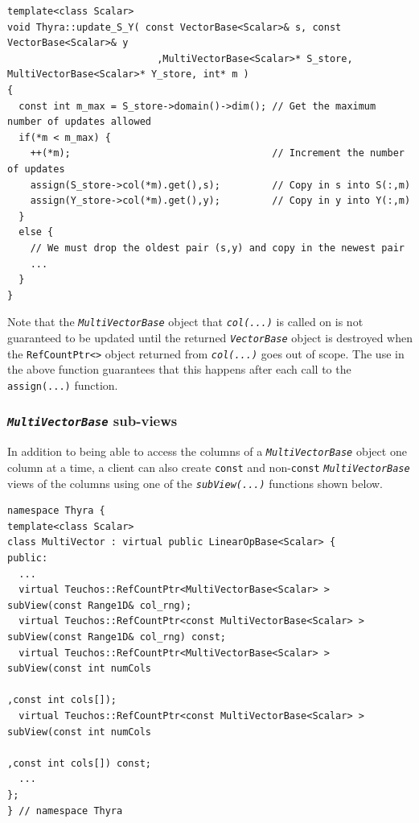 \documentclass[pdf,ps2pdf,11pt]{SANDreport}
\begin{document}
{\scriptsize\begin{verbatim}
template<class Scalar>
void Thyra::update_S_Y( const VectorBase<Scalar>& s, const VectorBase<Scalar>& y
                          ,MultiVectorBase<Scalar>* S_store, MultiVectorBase<Scalar>* Y_store, int* m )
{
  const int m_max = S_store->domain()->dim(); // Get the maximum number of updates allowed
  if(*m < m_max) {
    ++(*m);                                   // Increment the number of updates
    assign(S_store->col(*m).get(),s);         // Copy in s into S(:,m)         
    assign(Y_store->col(*m).get(),y);         // Copy in y into Y(:,m)
  }
  else {
    // We must drop the oldest pair (s,y) and copy in the newest pair
    ...
  }
}
\end{verbatim}}

{}\noindent{}Note that the {}\texttt{\textit{Multi\-Vector\-Base}} object
that {}\texttt{\textit{col(...)}} is called on is not guaranteed to be
updated until the returned {}\texttt{\textit{Vector\-Base}} object is
destroyed when the {}\texttt{RefCountPtr<>} object returned from
{}\texttt{\textit{col(...)}} goes out of scope.  The use in the above
function guarantees that this happens after each call to the
{}\texttt{assign(...)} function.

%
\subsubsection{\texttt{\textit{Multi\-Vector\-Base}} sub-views}
%

In addition to being able to access the columns of a
{}\texttt{\textit{Multi\-Vector\-Base}} object one column at a time, a client
can also create {}\texttt{const} and non-\texttt{const}
{}\texttt{\textit{Multi\-Vector\-Base}} views of the columns
using one of the {}\texttt{\textit{subView(...)}} functions shown below.

{\scriptsize\begin{verbatim}
namespace Thyra {
template<class Scalar>
class MultiVector : virtual public LinearOpBase<Scalar> {
public:
  ...
  virtual Teuchos::RefCountPtr<MultiVectorBase<Scalar> >       subView(const Range1D& col_rng);
  virtual Teuchos::RefCountPtr<const MultiVectorBase<Scalar> > subView(const Range1D& col_rng) const;
  virtual Teuchos::RefCountPtr<MultiVectorBase<Scalar> >       subView(const int numCols
                                                                        ,const int cols[]);
  virtual Teuchos::RefCountPtr<const MultiVectorBase<Scalar> > subView(const int numCols
                                                                        ,const int cols[]) const;
  ...
};
} // namespace Thyra
\end{verbatim}}
\end{document}
